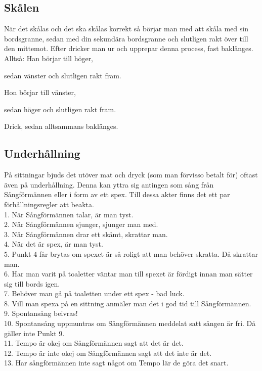 \subsection*{Skålen}

När det skålas och det ska skålas korrekt så börjar man 
med att skåla med sin bordsgranne, sedan med din sekundära 
bordsgranne och slutligen rakt över till den mittemot. 
Efter dricker man ur och upprepar denna process, fast baklänges.
\\

Alltså:
Han börjar till höger,

sedan vänster och slutligen rakt fram.

Hon börjar till vänster,

sedan höger och slutligen rakt fram.

Drick, sedan alltsammans baklänges.

\newpage

\subsection*{Underhållning}
På sittningar bjuds det utöver mat och dryck (som man förvisso betalt för) oftast även på underhållning.
Denna kan yttra sig antingen som sång från Sångförmännen eller i form av ett spex.
Till dessa akter finns det ett par förhållningsregler att beakta.
\\

1. När Sångförmännen talar, är man tyst.\\
2. När Sångförmännen sjunger, sjunger man med.\\
3. När Sångförmännen drar ett skämt, skrattar man.\\
4. När det är spex, är man tyst.\\
5. Punkt 4 får brytas om spexet är så roligt att man behöver skratta. Då skrattar man.\\
6. Har man varit på toaletter väntar man till spexet är fördigt innan man sätter sig till bords igen.\\
7. Behöver man gå på toaletten under ett spex - bad luck.\\
8. Vill man spexa på en sittning anmäler man det i god tid till Sångförmännen.\\
9. Spontansång beivras!\\
10. Spontansång uppmuntras om Sångförmännen meddelat satt sången är fri. Då gäller inte Punkt 9.\\
11. Tempo är okej om Sångförmännen sagt att det är det.\\
12. Tempo är inte okej om Sångförmännen sagt att det inte är det.\\
13. Har sångförmännen inte sagt något om Tempo lär de göra det snart.\\
\\


